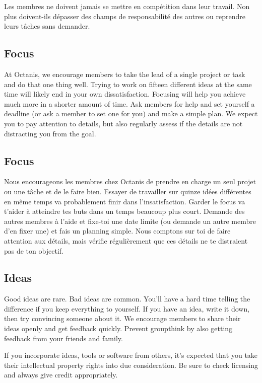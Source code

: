 	Les membres ne doivent jamais se mettre en compétition dans leur travail. Non plus doivent-ils dépasser des champs de responsabilité des autres ou reprendre leurs tâches sans demander.


	
\english
	\subsection{Focus}
	At Octanis, we encourage members to take the lead of a single project or task and do that one thing well. Trying to work on fifteen different ideas at the same time will likely end in your own dissatisfaction. Focusing will help you achieve much more in a shorter amount of time. Ask members for help and set yourself a deadline (or ask a member to set one for you) and make a simple plan.
	We expect you to pay attention to details, but also regularly assess if the details are not distracting you from the goal.




\french
	\subsection{Focus}
	Nous encourageons les membres chez Octanis de prendre en charge un seul projet ou une tâche et de le faire bien. Essayer de travailler sur quinze idées différentes en même temps va probablement finir dans l'insatisfaction. Garder le focus va t'aider à atteindre tes buts dans un temps beaucoup plus court. Demande des autres membres à l'aide et fixe-toi une date limite (ou demande un autre membre d'en fixer une) et fais un planning simple. 
	Nous comptons sur toi de faire attention aux détails, mais vérifie régulièrement que ces détails ne te distraient pas de ton objectif. 
	

\english
	\subsection{Ideas}
	Good ideas are rare. Bad ideas are common. You'll have a hard time telling the difference if you keep everything to yourself.
	If you have an idea, write it down, then try convincing someone about it. We encourage members to share their ideas openly and get feedback quickly. Prevent groupthink by also getting feedback from your friends and family.

	If you incorporate ideas, tools or software from others, it's expected that you take their intellectual property rights into due consideration. Be sure to check licensing and always give credit appropriately.


